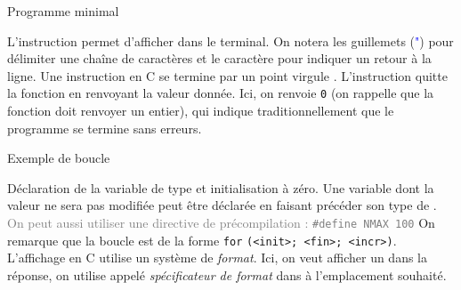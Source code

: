 \documentclass[10pt]{beamer}
\begin{document}
\begin{frame}[fragile]{\Ctitle}{\stitle}
\begin{exampleblock}{Programme minimal}
\begin{overprint}
			\medskip
			L'instruction  permet d'afficher dans le terminal. On notera les guillemets (\textcolor{blue}{"}) pour délimiter une chaîne de caractères et le caractère  pour indiquer un retour à la ligne. Une instruction en C se termine par un point virgule \kw{;}.
			\onslide<6>
			\medskip
			L'instruction  quitte la fonction en renvoyant la valeur donnée. Ici, on renvoie {\tt 0} (on rappelle que la fonction doit renvoyer un entier), qui indique traditionnellement que le programme se  termine sans erreurs.
		\end{overprint}
	\end{exampleblock}

\end{frame}

\begin{frame}{\Ctitle}{\stitle}
	\begin{exampleblock}{Exemple de boucle}
		\begin{overprint}
		\medskip
		Déclaration de la variable  de type  et initialisation à zéro.
		\onslide<2>
		\medskip
		Une variable dont la valeur ne sera pas modifiée peut être déclarée  en faisant précéder son type de .\\
		\textcolor{gray}{On peut aussi utiliser une directive de précompilation : {\tt \#define NMAX 100}}
		\onslide<3>
		\medskip
		On remarque que la boucle  est de la forme {\tt for} {\tt(<init>; <fin>; <incr>)}.
		\onslide<4>
		L'affichage en C utilise un système de \textit{format}. Ici, on veut afficher un  dans la réponse, on utilise  appelé \textit{spécificateur de format} dans  à l'emplacement souhaité.
		\medskip
		\end{overprint}
	\end{exampleblock}
\end{frame}
\end{document}
